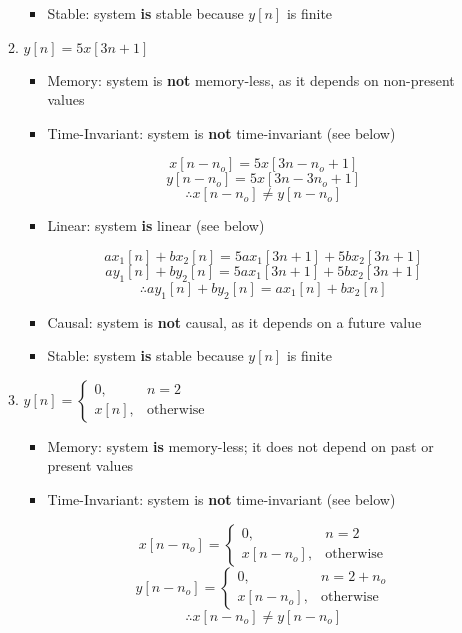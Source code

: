 \begin{enumerate}
\begin{enumerate}
\begin{itemize}
          \item Stable: system \textbf{is} stable because $y[n]$ is finite

        \end{itemize}

      \item $y[n]=5x[3n+1]$

        \begin{itemize}

          \item Memory: system is \textbf{not} memory-less, as it depends on non-present values

          \item Time-Invariant: system is \textbf{not} time-invariant (see below)

            $$x[n-n_o]=5x[3n-n_o+1]$$
            $$y[n-n_o]=5x[3n-3n_o+1]$$
            $$\therefore x[n-n_o]\neq y[n-n_o]$$

          \item Linear: system \textbf{is} linear (see below)

            $$ax_1[n]+bx_2[n]=5ax_1[3n+1]+5bx_2[3n+1]$$
            $$ay_1[n]+by_2[n]=5ax_1[3n+1]+5bx_2[3n+1]$$
            $$\therefore ay_1[n]+by_2[n]=ax_1[n]+bx_2[n]$$

          \item Causal: system is \textbf{not} causal, as it depends on a future value

          \item Stable: system \textbf{is} stable because $y[n]$ is finite

        \end{itemize}

      \item $y[n]=\left\{ \begin{array}{ll} 0, & n=2\\ x[n], & \text{otherwise}\end{array}$

        \begin{itemize}

          \item Memory: system \textbf{is} memory-less; it does not depend on past or present values

          \item Time-Invariant: system is \textbf{not} time-invariant (see below)

            $$x[n-n_o]=\left\{ \begin{array}{ll} 0, & n=2\\ x[n-n_o], & \text{otherwise}\end{array}$$
            $$y[n-n_o]=\left\{ \begin{array}{ll} 0, & n=2+n_o\\ x[n-n_o], & \text{otherwise}\end{array}$$
            $$\therefore x[n-n_o]\neq y[n-n_o]$$


\end{itemize}
\end{enumerate}
\end{enumerate}
